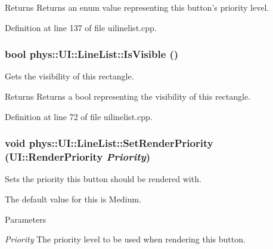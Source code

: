 \begin{DoxyReturn}{Returns}
Returns an enum value representing this button's priority level. 
\end{DoxyReturn}


Definition at line 137 of file uilinelist.cpp.

\hypertarget{classphys_1_1UI_1_1LineList_af8c50f2e60b5a087cc9f3a280e10bd72}{
\subsubsection[{IsVisible}]{\setlength{\rightskip}{0pt plus 5cm}bool phys::UI::LineList::IsVisible ()}}
\label{d7/de8/classphys_1_1UI_1_1LineList_af8c50f2e60b5a087cc9f3a280e10bd72}


Gets the visibility of this rectangle. 

\begin{DoxyReturn}{Returns}
Returns a bool representing the visibility of this rectangle. 
\end{DoxyReturn}


Definition at line 72 of file uilinelist.cpp.

\hypertarget{classphys_1_1UI_1_1LineList_aa108c16282875850e5a6c01353977e97}{
\subsubsection[{SetRenderPriority}]{\setlength{\rightskip}{0pt plus 5cm}void phys::UI::LineList::SetRenderPriority (UI::RenderPriority {\em Priority})}}
\label{d7/de8/classphys_1_1UI_1_1LineList_aa108c16282875850e5a6c01353977e97}


Sets the priority this button should be rendered with. 

The default value for this is Medium. 
\begin{DoxyParams}{Parameters}
\item[{\em Priority}]The priority level to be used when rendering this button. \end{DoxyParams}


